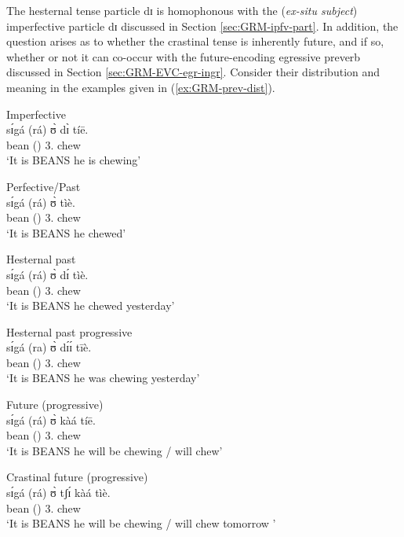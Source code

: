 \begin{exe}
\begin{exe}
\begin{exe}
{\begin{exe}
\begin{exe}
\begin{exe}
\begin{exe}
\begin{exe}
\begin{exe}
\begin{exe}
\begin{exe}
\begin{exe}
\begin{exe}
\begin{exe}
\begin{exe}
\begin{exe}
\begin{exe}
\begin{exe}
\begin{exe}
\begin{exe}
\begin{exe}
\begin{exe}
\begin{exe}
The hesternal tense particle {\sls dɪ} is homophonous with the ({\it ex-situ
subject}) imperfective particle  {\sls dɪ} discussed in Section
\ref{sec:GRM-ipfv-part}.  In addition, the question arises as to whether the
crastinal tense  is inherently future, and if so, whether or not it can
co-occur with the future-encoding egressive preverb discussed in Section
\ref{sec:GRM-EVC-egr-ingr}. Consider their distribution and meaning in the
examples given in (\ref{ex:GRM-prev-dist}).


\ea\label{ex:GRM-prev-dist}

\ea\label{ex:GRM-prev-dist-chew-presprog}{\rm Imperfective}\\
\gll  sɪ́gá (rá)  ʊ̀ dɪ̀  tíē.\\
 bean  ({\foc}) {3.\sg} {\ipfv} chew\\
\glt `It is BEANS he is chewing'

 \ex\label{ex:GRM-prev-dist-chew-past}{\rm Perfective/Past}\\
\gll  sɪ́gá (rá) ʊ̀   tìè.\\
 bean  ({\foc}) {3.\sg}  chew\\
\glt `It is BEANS he chewed'


 \ex\label{ex:GRM-prev-dist-chew-past}{\rm Hesternal past}\\
\gll  sɪ́gá (rá) ʊ̀ dɪ́ tìè.\\
 bean  ({\foc}) {3.\sg} {\hest}  chew\\
\glt `It is BEANS he chewed yesterday'


 \ex\label{ex:GRM-prev-dist-chew-past-pro}{\rm Hesternal past progressive}\\
\gll  sɪ́gá (ra) ʊ̀ dɪ́ɪ́ tīè.\\
 bean  ({\foc}) {3.\sg} {\hest}  chew\\
\glt `It is BEANS he was chewing yesterday'

 \ex\label{ex:GRM-prev-dist-chew-futprog}{\rm Future (progressive)}\\
\gll  sɪ́gá (rá) ʊ̀  kàá   tíē.\\
 bean  ({\foc}) {3.\sg} {\fut}  chew\\
\glt `It is BEANS he will be chewing / will chew'

 \ex\label{ex:GRM-foc-top-chew-crasfutprog}{\rm Crastinal future 
(progressive)}\\
\gll  sɪ́gá (rá) ʊ̀ tʃɪ́  kàá   tìè.\\
 bean  ({\foc}) {3.\sg} {\cras} {\fut}   chew\\
\glt `It is BEANS he will be chewing / will chew tomorrow '



\end{exe}
\end{exe}
\end{exe}
\end{exe}
\end{exe}
\end{exe}
\end{exe}
\end{exe}
\end{exe}
\end{exe}
\end{exe}
\end{exe}
\end{exe}
\end{exe}
\end{exe}
\end{exe}
\end{exe}
\end{exe}
\end{exe}
\end{exe}}
\end{exe}
\end{exe}
\end{exe}
